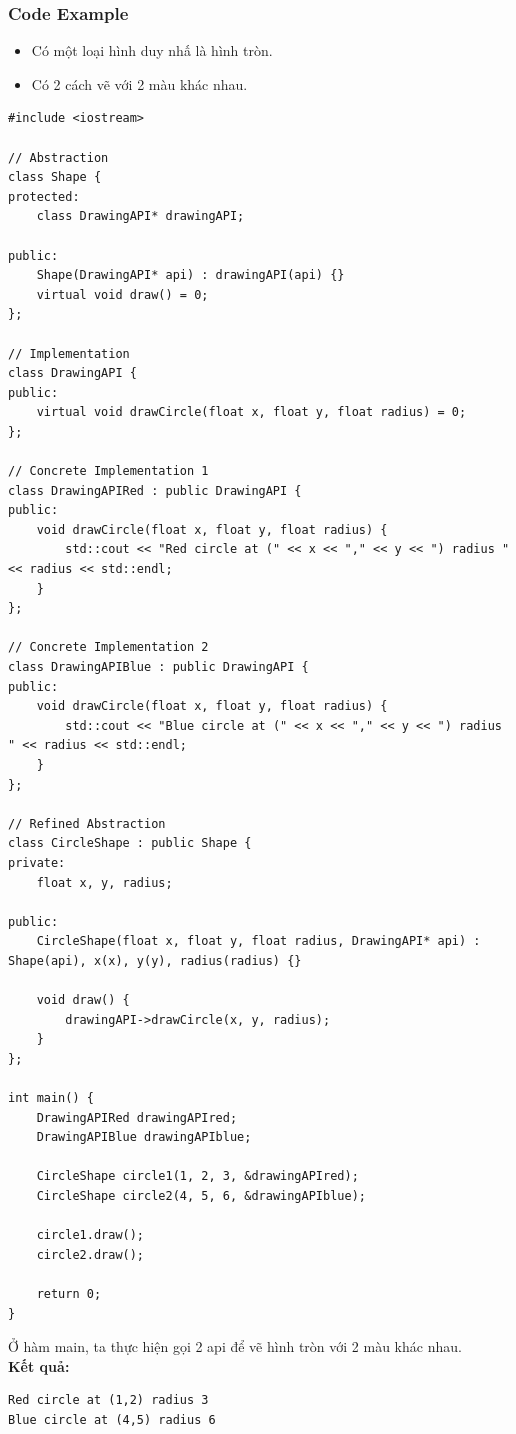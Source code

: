\subsubsection{Code Example}
\begin{itemize}
    \item Có một loại hình duy nhấ là hình tròn.
    \item Có 2 cách vẽ với 2 màu khác nhau.
\end{itemize}
\begin{lstlisting}
#include <iostream>

// Abstraction
class Shape {
protected:
    class DrawingAPI* drawingAPI;

public:
    Shape(DrawingAPI* api) : drawingAPI(api) {}
    virtual void draw() = 0;
};

// Implementation
class DrawingAPI {
public:
    virtual void drawCircle(float x, float y, float radius) = 0;
};

// Concrete Implementation 1
class DrawingAPIRed : public DrawingAPI {
public:
    void drawCircle(float x, float y, float radius) {
        std::cout << "Red circle at (" << x << "," << y << ") radius " << radius << std::endl;
    }
};

// Concrete Implementation 2
class DrawingAPIBlue : public DrawingAPI {
public:
    void drawCircle(float x, float y, float radius) {
        std::cout << "Blue circle at (" << x << "," << y << ") radius " << radius << std::endl;
    }
};

// Refined Abstraction
class CircleShape : public Shape {
private:
    float x, y, radius;

public:
    CircleShape(float x, float y, float radius, DrawingAPI* api) : Shape(api), x(x), y(y), radius(radius) {}

    void draw() {
        drawingAPI->drawCircle(x, y, radius);
    }
};

int main() {
    DrawingAPIRed drawingAPIred;
    DrawingAPIBlue drawingAPIblue;

    CircleShape circle1(1, 2, 3, &drawingAPIred);
    CircleShape circle2(4, 5, 6, &drawingAPIblue);

    circle1.draw();
    circle2.draw();

    return 0;
}

\end{lstlisting}
Ở hàm main, ta thực hiện gọi 2 api để vẽ hình tròn với 2 màu khác nhau.\\
\newline
\textbf{Kết quả:}
\begin{lstlisting}
Red circle at (1,2) radius 3
Blue circle at (4,5) radius 6
\end{lstlisting}
